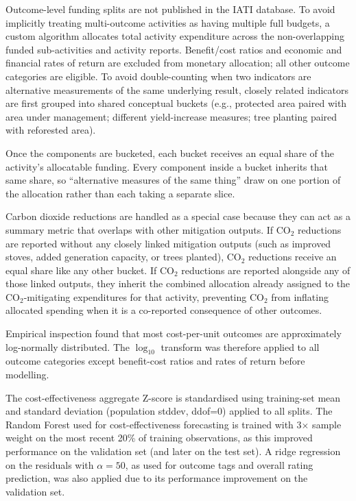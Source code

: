 Outcome-level funding splits are not published in the IATI database. To avoid implicitly treating multi-outcome activities as having multiple full budgets, a custom algorithm allocates total activity expenditure across the non-overlapping funded sub-activities and activity reports. Benefit/cost ratios and economic and financial rates of return are excluded from monetary allocation; all other outcome categories are eligible. To avoid double-counting when two indicators are alternative measurements of the same underlying result, closely related indicators are first grouped into shared conceptual buckets (e.g., protected area paired with area under management; different yield-increase measures; tree planting paired with reforested area).

Once the components are bucketed, each bucket receives an equal share of the activity’s allocatable funding. Every component inside a bucket inherits that same share, so ``alternative measures of the same thing'' draw on one portion of the allocation rather than each taking a separate slice.

Carbon dioxide reductions are handled as a special case because they can act as a summary metric that overlaps with other mitigation outputs. If CO$_2$ reductions are reported without any closely linked mitigation outputs (such as improved stoves, added generation capacity, or trees planted), CO$_2$ reductions receive an equal share like any other bucket. If CO$_2$ reductions are reported alongside any of those linked outputs, they inherit the combined allocation already assigned to the CO$_2$-mitigating expenditures for that activity, preventing CO$_2$ from inflating allocated spending when it is a co-reported consequence of other outcomes.

Empirical inspection found that most cost-per-unit outcomes are approximately log-normally distributed. The $\log_{10}$ transform was therefore applied to all outcome categories except benefit-cost ratios and rates of return before modelling.

The cost-effectiveness aggregate Z-score is standardised using training-set mean and standard deviation (population stddev, ddof=0) applied to all splits. The Random Forest used for cost-effectiveness forecasting is trained with 3$\times$ sample weight on the most recent 20\% of training observations, as this improved performance on the validation set (and later on the test set). A ridge regression on the residuals with $\alpha=50$, as used for outcome tags and overall rating prediction, was also applied due to its performance improvement on the validation set.

